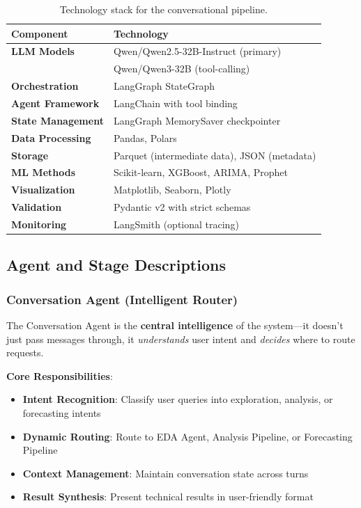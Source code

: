 \documentclass[11pt,a4paper]{article}
\begin{document}
\begin{table}[H]
\centering
\small
\begin{tabular}{ll}
\toprule
\textbf{Component} & \textbf{Technology} \\
\midrule
\textbf{LLM Models} & Qwen/Qwen2.5-32B-Instruct (primary) \\
 & Qwen/Qwen3-32B (tool-calling) \\
\midrule
\textbf{Orchestration} & LangGraph StateGraph \\
\textbf{Agent Framework} & LangChain with tool binding \\
\textbf{State Management} & LangGraph MemorySaver checkpointer \\
\midrule
\textbf{Data Processing} & Pandas, Polars \\
\textbf{Storage} & Parquet (intermediate data), JSON (metadata) \\
\textbf{ML Methods} & Scikit-learn, XGBoost, ARIMA, Prophet \\
\textbf{Visualization} & Matplotlib, Seaborn, Plotly \\
\midrule
\textbf{Validation} & Pydantic v2 with strict schemas \\
\textbf{Monitoring} & LangSmith (optional tracing) \\
\bottomrule
\end{tabular}
\caption{Technology stack for the conversational pipeline.}
\end{table}

\subsection{Agent and Stage Descriptions}

\subsubsection{Conversation Agent (Intelligent Router)}

The Conversation Agent is the \textbf{central intelligence} of the system---it doesn't just pass messages through, it \textit{understands} user intent and \textit{decides} where to route requests.

\textbf{Core Responsibilities}:
\begin{itemize}
    \item \textbf{Intent Recognition}: Classify user queries into exploration, analysis, or forecasting intents
    \item \textbf{Dynamic Routing}: Route to EDA Agent, Analysis Pipeline, or Forecasting Pipeline
    \item \textbf{Context Management}: Maintain conversation state across turns
    \item \textbf{Result Synthesis}: Present technical results in user-friendly format
\end{itemize}
\end{document}
